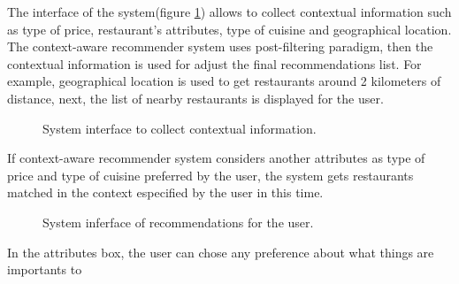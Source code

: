 The interface of the system(figure \ref{fig:context}) allows to
collect contextual information such as type of price, restaurant's
attributes, type of cuisine and geographical location. \\ 
The context-aware recommender system uses post-filtering paradigm, 
then the contextual information is used for adjust the final 
recommendations list. For example, geographical location is used to get restaurants
around 2 kilometers of distance, next, the list of nearby restaurants
is displayed for the user.\\  
\begin{figure}
\captionsetup{justification=centering,margin=2cm,font=footnotesize}
\centering
{}
\caption{System interface to collect contextual information.}
\label{fig:context}   
\end{figure}
If context-aware recommender system
considers another attributes as type of price and type of cuisine
preferred by the user, the system gets restaurants matched in the
context especified by the user in this time. 
\begin{figure}
\captionsetup{font=footnotesize}
\centering
{}
\caption{System inferface of recommendations for the user.}
\label{fig:recom}    
\end{figure}
In the attributes box,
the user can chose any preference about what things are importants to
